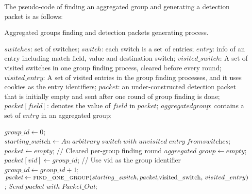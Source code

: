 The pseudo-code of finding an aggregated group and generating a detection packet is as follows:

\begin {tcolorbox}[blanker,float=tbp,
grow to left by=1cm, grow to right by=1cm]
\label{pseudo}
\begin{algorithm}[H]

  \caption{Aggregated groups finding and detection packets generating process.}
  \begin{algorithmic}[1]
    \Require
      $switches$: set of switches;  \newline
      $switch$: each switch is a set of entries;  \newline
      $entry$: info of an entry including match field, value and destination switch;  \newline
      $visited\_switch$: A set of visited switches in one group finding process, cleared before every round;  \newline
      $visited\_entry$: A set of visited entries in the group finding processes, and it uses cookies as the entry identifiers; \newline
      $packet$: an under-constructed detection packet that is initially empty and sent after one round of group finding is done; \newline
      $packet[field]$: denotes the value of $field$ in $packet$; \newline
      $aggregated group$: contains a set of $entry$ in an aggregated group; \newline

      
      \State $\textit{group\_id} \gets 0$;
            \State $\textit{starting\_switch} \gets An\;arbitrary\;switch\;with\;unvisited\;entry\;from\textit{switches}$;
            \State $\textit{packet} \gets empty$;   // Cleared per-group finding round
            \State $\textit{aggregated\_group} \gets empty$;
            \State $packet[vid] \gets \textit{group\_id}$;   // Use vid as the group identifier 
            \State $group\_id \gets \textit{group\_id} + 1$;
            \State $\textit{packet} \gets \Call{find\_one\_group}{\textit{starting\_switch}, \textit{packet}, $visited\_switch, $visited\_entry}$;
            \State $Send\;\textit{packet}\;with\;Packet\_Out$;
      \EndWhile
    \EndFunction
  \end{algorithmic}
\end{algorithm}
\end{tcolorbox}

